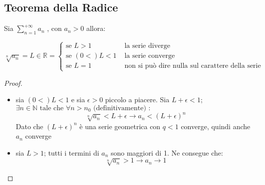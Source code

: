 \documentclass[a4paper,12pt, oneside]{book}
\begin{document}
\subsection{Teorema della Radice}
\begin{teorema}
	Sia $\sum_{n=1}^{+\infty} a_n$ , con $a_n>0$ allora:
	\begin{center}
		$\sqrt[n]{a_n}=L\in \mathbb{R}=\left\{
			\begin{array}{ll}
				\mbox{se  } L>1     & \mbox{  la serie diverge}                                \\
				\mbox{se  } (0<)L<1 & \mbox{  la serie converge}                               \\
				\mbox{se  } L=1     & \mbox{  non si può dire nulla sul carattere della serie}
			\end{array}
			\right.$
	\end{center}
\end{teorema}
\begin{proof}
	\begin{itemize}
		\item sia $(0<)L<1$ e sia $\epsilon >0$ piccolo a piacere. Sia $L+\epsilon<1$; $\exists n\in\mathbb{N} \mbox{  tale che  } \forall n>n_0\mbox{  (definitivamente) }:$
		      $$\sqrt[n]{a_n}<L+\epsilon \longrightarrow a_n<{(L+\epsilon)}^{n}$$
		      Dato che ${(L+\epsilon)}^{n}$ è una serie geometrica con $q<1$ converge, quindi anche $a_n$ converge
		\item sia $L>1$; tutti i termini di $a_n$ sono maggiori di 1. Ne consegue che:
		      $$\sqrt[n]{a_n}>1 \longrightarrow a_n\rightarrow 1$$
	\end{itemize}
\end{proof}
\newpage
\end{document}
